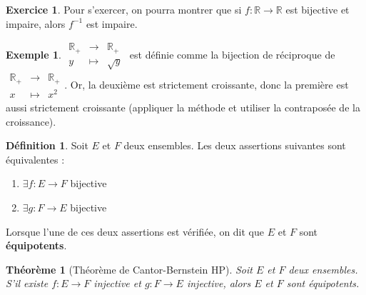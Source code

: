 \documentclass[french]{book}
\newcommand{\R}{\mathbb{R}}
\newcommand{\inv}{^{-1}}
\theoremstyle{plain}
\newtheorem{thm}{Théorème}[chapter]
\theoremstyle{definition}
\newtheorem{dfn}{Définition}[chapter]
\newtheorem{exa}{Exemple}[chapter]
\newtheorem{exe}{Exercice}[chapter]
\theoremstyle{remark}
\begin{document}
\begin{exe}
	Pour s'exercer, on pourra montrer que si $f:\R\rightarrow\R$ est bijective et impaire, alors $f\inv$ est impaire.
\end{exe}
\begin{exa}
	$\begin{array}{ccc}\R_+&\rightarrow&\R_+\\y&\mapsto&\sqrt{y}\end{array}$ est définie comme la bijection de réciproque de $\begin{array}{ccc}\R_+&\rightarrow&\R_+\\x&\mapsto&x^2\end{array}$. Or, la deuxième est strictement croissante, donc la première est aussi strictement croissante (appliquer la méthode et utiliser la contraposée de la croissance).
\end{exa}
\begin{dfn}
	Soit $E$ et $F$ deux ensembles. Les deux assertions suivantes sont équivalentes :\begin{enumerate}
		\item $\exists f:E\rightarrow F$ bijective
		\item $\exists g:F\rightarrow E$ bijective
	\end{enumerate}
	Lorsque l'une de ces deux assertions est vérifiée, on dit que $E$ et $F$ sont \textbf{équipotents}.
\end{dfn}
\begin{thm}[Théorème de Cantor-Bernstein HP]
	Soit $E$ et $F$ deux ensembles. S'il existe $f:E\rightarrow F$ injective et $g:F\rightarrow E$ injective, alors $E$ et $F$ sont équipotents.
\end{thm}
\end{document}
